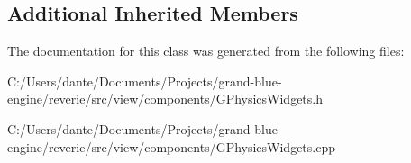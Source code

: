 \subsection*{Additional Inherited Members}


The documentation for this class was generated from the following files\+:\begin{DoxyCompactItemize}
\item 
C\+:/\+Users/dante/\+Documents/\+Projects/grand-\/blue-\/engine/reverie/src/view/components/G\+Physics\+Widgets.\+h\item 
C\+:/\+Users/dante/\+Documents/\+Projects/grand-\/blue-\/engine/reverie/src/view/components/G\+Physics\+Widgets.\+cpp\end{DoxyCompactItemize}
